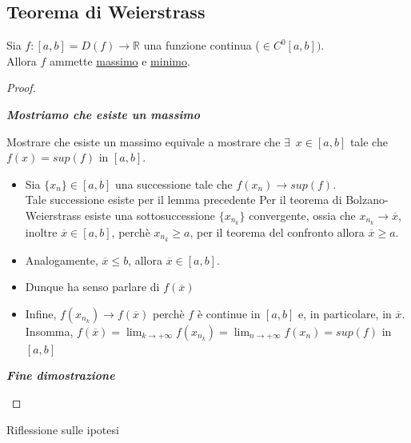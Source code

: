 \documentclass{article}
\theoremstyle{definition}
\begin{document}
\subsection{Teorema di Weierstrass}
Sia $f: [a,b]=D(f) \to \mathbb{R}$ una funzione continua ($\in C^0[a,b])$.
\\
Allora $f$ ammette \underline{massimo} e \underline{minimo}.
\begin{proof}
    \begin{center}
        \textbf{\textit{Mostriamo che esiste un massimo}}
    \end{center}
    Mostrare che esiste un massimo equivale a mostrare che $\exists \,\,\, x \in [a,b]$ tale che $f(x)=sup(f)$ in $[a,b]$.
    \\
    \begin{itemize}
        \item Sia $\{x_n\} \in [a,b]$ una successione tale che $f(x_n) \to sup(f)$.
        \\
        Tale successione esiste per il lemma precedente
        Per il teorema di Bolzano-Weierstrass esiste una sottosuccessione $\{x_{n_k}\}$ convergente, ossia che $x_{n_k} \to \overline{x}$, inoltre $\overline{x} \in [a,b]$, perchè $x_{n_k} \geqslant a$, per il teorema del confronto allora $\overline{x} \geqslant a$.
        \item Analogamente, $\overline{x} \leqslant b$, allora $\overline{x} \in [a,b]$.
        \item Dunque ha senso parlare di $f(\overline{x})$
        \item Infine, $f(x_{n_k})\to f(\overline{x})$ perchè $f$ è continue in $[a,b]$ e, in particolare, in $\overline{x}$.
        \\
        Insomma, $f(\overline{x})=\lim_{k \to +\infty}f(x_{n_k})=\lim_{n \to +\infty}f(x_n)=sup(f)$ in $[a,b]$
    \end{itemize}
    \begin{center}
        \textbf{\textit{Fine dimostrazione}}
    \end{center}
\end{proof}
\begin{center}
    Riflessione sulle ipotesi
\end{center}
\end{document}
